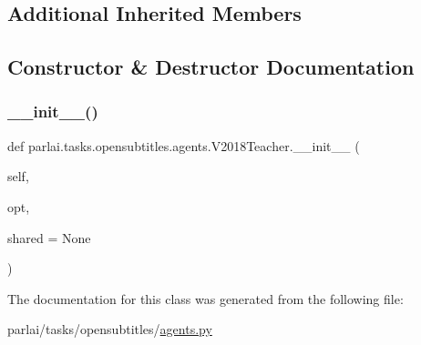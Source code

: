 \subsection*{Additional Inherited Members}


\subsection{Constructor \& Destructor Documentation}
\mbox{\label{classparlai_1_1tasks_1_1opensubtitles_1_1agents_1_1V2018Teacher_a10803c76b3b6467a673659099d90d777}} 
\subsubsection{\texorpdfstring{\+\_\+\+\_\+init\+\_\+\+\_\+()}{\_\_init\_\_()}}
{\footnotesize\ttfamily def parlai.\+tasks.\+opensubtitles.\+agents.\+V2018\+Teacher.\+\_\+\+\_\+init\+\_\+\+\_\+ (\begin{DoxyParamCaption}\item[{}]{self,  }\item[{}]{opt,  }\item[{}]{shared = {\ttfamily None} }\end{DoxyParamCaption})}



The documentation for this class was generated from the following file\+:\begin{DoxyCompactItemize}
\item 
parlai/tasks/opensubtitles/\hyperlink{parlai_2tasks_2opensubtitles_2agents_8py}{agents.\+py}\end{DoxyCompactItemize}
